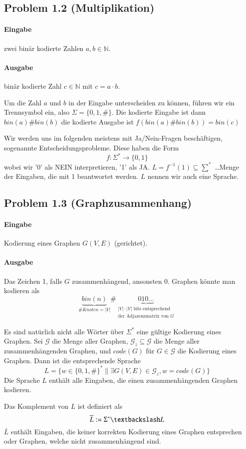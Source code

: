 \subsection*{Problem 1.2 (Multiplikation)}
\paragraph*{Eingabe} zwei binär kodierte Zahlen $a,b \in \mathbb{N}$.
\paragraph*{Ausgabe} binär kodierte Zahl $c \in \mathbb{N}$ mit $c=a \cdot b$.

\par\medskip
Um die Zahl $a$ und $b$ in der Eingabe unterscheiden zu können, führen wir ein Trennsymbol ein, also $\Sigma = \{ 0,1,\# \}$. Die kodierte Eingabe ist dann $bin(a)\#bin(b)$ die kodierte Ausgabe ist $f(bin(a)\#bin(b))=bin(c)$
\par\bigskip
Wir werden uns im folgenden meistens mit Ja/Nein-Fragen beschäftigen, sogenannte Entscheidungsprobleme. Diese haben die Form $$ f:\Sigma^* \rightarrow \{ 0,1 \} $$ wobei wir '0' als NEIN interpretieren, '1' als JA. $ L=f^{-1}(1) \subseteq \sum^* $ \dots Menge der Eingaben, die mit 1 beantwortet werden. $L$ nennen wir auch eine Sprache.
\par\medskip

\subsection*{Problem 1.3 (Graphzusammenhang)}
\paragraph*{Eingabe} Kodierung eines Graphen $G(V,E)$ (gerichtet).
\paragraph*{Ausgabe} Das Zeichen 1, falls $G$ zusammenhängend, ansonsten 0. Graphen könnte man kodieren als $$ \underbrace{bin(n)}_{\# Knoten = |V|}\# \underbrace{010 \dots}_{\substack{|V| \cdot |V| \text{ bits entsprechend} \\ \text{der Adjazenzmatrix von } G} } $$ %

\par\medskip
Es sind natürlich nicht alle Wörter über $\Sigma^*$ eine gültige Kodierung eines Graphen. Sei $\mathcal{G}$ die Menge aller Graphen, $\mathcal{G}_z \subseteq \mathcal{G}$ die Menge aller zusammenhängenden Graphen, und $code(G)$ für $G \in \mathcal{G}$ die Kodierung eines Graphen. Dann ist die entsprechende Sprache $$ L=\{ w \in \{ 0,1,\# \}^* \| \exists G(V,E) \in \mathcal{G}_z, w=code(G) \} $$ Die Sprache $L$ enthält alle Eingaben, die einen zusammenhängenden Graphen kodieren.
\par\medskip
Das Komplement von $L$ ist definiert als $$ \overline{L} := \Sigma^* \textbackslash L $$ $\overline{L}$ enthält Eingaben, die keiner korrekten Kodierung eines Graphen entsprechen oder Graphen, welche nicht zusammenhängend sind.


